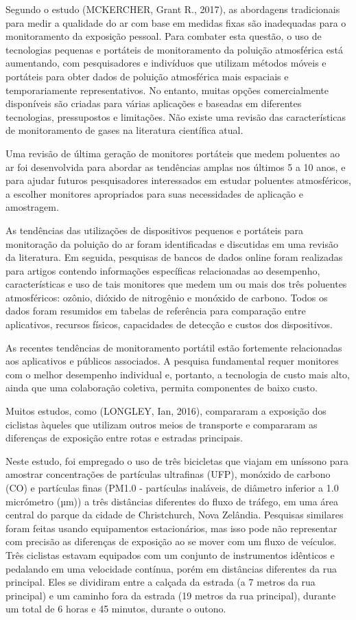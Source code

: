 Segundo o estudo (MCKERCHER, Grant R., 2017), as abordagens tradicionais para medir a qualidade do ar 
com base em medidas fixas são inadequadas para o monitoramento da exposição pessoal. Para combater 
esta questão, o uso de tecnologias pequenas e portáteis de monitoramento da poluição atmosférica está 
aumentando, com pesquisadores e indivíduos que utilizam métodos móveis e portáteis para obter dados 
de poluição atmosférica mais espaciais e temporariamente representativos. No entanto, muitas opções 
comercialmente disponíveis são criadas para várias aplicações e baseadas em diferentes tecnologias, 
pressupostos e limitações. Não existe uma revisão das características de monitoramento de gases na 
literatura científica atual.

Uma revisão de última geração de monitores portáteis que medem poluentes ao ar foi desenvolvida para 
abordar as tendências amplas nos últimos 5 a 10 anos, e para ajudar futuros pesquisadores 
interessados em estudar poluentes atmosféricos, a escolher monitores apropriados para suas 
necessidades de aplicação e amostragem.

As tendências das utilizações de dispositivos pequenos e portáteis para monitoração da poluição do ar 
foram identificadas e discutidas em uma revisão da literatura. Em seguida, pesquisas de bancos de 
dados online foram realizadas para artigos contendo informações específicas relacionadas ao 
desempenho, características e uso de tais monitores que medem um ou mais dos três poluentes 
atmosféricos: ozônio, dióxido de nitrogênio e monóxido de carbono. Todos os dados foram resumidos em 
tabelas de referência para comparação entre aplicativos, recursos físicos, capacidades de detecção e 
custos dos dispositivos.

As recentes tendências de monitoramento portátil estão fortemente relacionadas aos aplicativos e 
públicos associados. A pesquisa fundamental requer monitores com o melhor desempenho individual e, 
portanto, a tecnologia de custo mais alto, ainda que uma colaboração coletiva, permita componentes 
de baixo custo.

Muitos estudos, como (LONGLEY, Ian, 2016), compararam a exposição dos ciclistas àqueles que utilizam 
outros meios de transporte e compararam as diferenças de exposição entre rotas e estradas principais. 

Neste estudo, foi empregado o uso de três bicicletas que viajam em uníssono para amostrar 
concentrações de partículas ultrafinas (UFP), monóxido de carbono (CO) e partículas finas (PM1.0 - 
partículas inaláveis, de diâmetro inferior a 1.0 micrómetro (µm)) a três distâncias diferentes do 
fluxo de tráfego, em uma área central do parque da cidade de Christchurch, Nova Zelândia. Pesquisas 
similares foram feitas usando equipamentos estacionários, mas isso pode não representar com precisão 
as diferenças de exposição ao se mover com um fluxo de veículos. Três ciclistas estavam equipados com 
um conjunto de instrumentos idênticos e pedalando em uma velocidade contínua, porém em distâncias 
diferentes da rua principal. Eles se dividiram entre a calçada da estrada (a 7 metros da rua 
principal) e um caminho fora da estrada (19 metros da rua principal), durante um total de 6 horas e 
45 minutos, durante o outono. 

